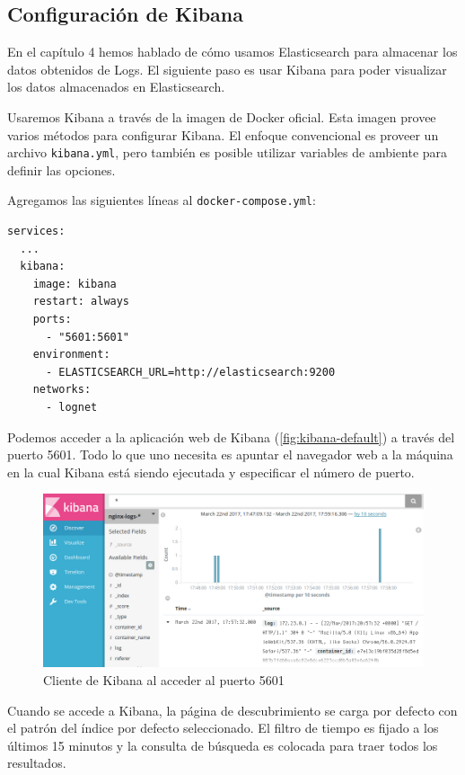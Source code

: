 \subsection{Configuración de Kibana}
\label{configuracion-de-kibana}

En el capítulo 4 hemos hablado de cómo usamos Elasticsearch para almacenar los datos obtenidos de Logs. El siguiente paso es usar Kibana para poder visualizar los datos almacenados en Elasticsearch.

Usaremos Kibana a través de la imagen de Docker oficial. Esta imagen provee varios métodos para configurar Kibana. El enfoque convencional es proveer un archivo \lstinline{kibana.yml}, pero también es posible utilizar variables de ambiente para definir las opciones.

Agregamos las siguientes líneas al \lstinline{docker-compose.yml}:

\begin{lstlisting}
services:
  ...
  kibana:
    image: kibana
    restart: always
    ports:
      - "5601:5601"
    environment:
      - ELASTICSEARCH_URL=http://elasticsearch:9200
    networks:
      - lognet
\end{lstlisting}

Podemos acceder a la aplicación web de Kibana (\autoref{fig:kibana-default}) a través del puerto 5601. Todo lo que uno necesita es apuntar el navegador web a la máquina en la cual Kibana está siendo ejecutada y especificar el número de puerto. 

\begin{figure}
  \includegraphics[width=\linewidth]{src/images/05-capitulo-5/kibanadefault.jpg}
  \caption{Cliente de Kibana al acceder al puerto 5601}
  \label{fig:kibana-default}
\end{figure}

Cuando se accede a Kibana, la página de descubrimiento se carga por defecto con el patrón del índice por defecto seleccionado. El filtro de tiempo es fijado a los últimos 15 minutos y la consulta de búsqueda es colocada para traer todos los resultados.

